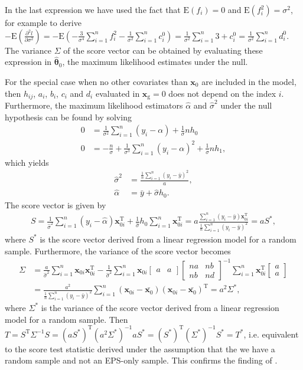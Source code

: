 \documentclass[10pt,a4paper]{article}
\def\bx{\mathbf{x}}
\def\bxoi{\mathbf{x}_{0i}}
\def\bxg{\mathbf{x}_{\text{g}}}
\def\E{\text{E}}
\begin{document}
In the last expression we have used the fact that $\E(f_i) = 0$ and $\E(f_i^{2}) = \sigma^{2}$, for example to derive $- \E\left(\frac{\partial^2 l}{\partial \sigma^2}\right) = -\E(- \frac{3}{\sigma^4}\sum_{i=1}^n f_i^2 - \frac{1}{\sigma^2}\sum_{i=1}^n c_i^{0} ) = \frac{1}{\sigma^2}\sum_{i=1}^n 3 + c_i^{0} = \frac{1}{\sigma^2}\sum_{i=1}^n d_i^{0}$. The variance $\Sigma$ of the score vector can  be obtained by evaluating these expression in $\hat{\boldsymbol\theta}_0$, the maximum likelihood estimates under the null.

For the special case when no other covariates than $\bx_0$ are included in the model, then $h_{ij}$, $a_i$, $b_i$, $c_i$ and $d_i$ evaluated in $\bxg = 0$ does not depend on the index $i$. Furthermore, the maximum likelihood estimators $\hat{\alpha}$ and $\hat{\sigma}^2$ under the null hypothesis can be found by solving
\begin{align*}
0 & = \frac{1}{\sigma^2}\sum_{i=1}^n (y_i - \alpha) + \frac{1}{\sigma}nh_0 \\
0 & = -\frac{n}{\sigma} + \frac{1}{\sigma^3}\sum_{i=1}^n(y_i - \alpha)^2 + \frac{1}{\sigma}nh_1,
\end{align*}
which yields 
\begin{align*}
\hat{\sigma}^2 &= \frac{\frac{1}{n}\sum_{i=1}^n (y_i - \bar{y})^2}{a}, \\
\hat{\alpha} &= \bar{y} + \hat{\sigma}h_0.
\end{align*}
The score vector is given by
\begin{align*}
S = \frac{1}{\hat{\sigma}^2}\sum_{i=1}^n (y_i - \hat{\alpha}) \bxoi^{\text{T}} + \frac{1}{\hat{\sigma}}h_0\sum_{i=1}^n  \bxoi^{\text{T}} = a \frac{\sum_{i=1}^n (y_i - \bar{y})\bxoi^{\text{T}}}{\frac{1}{n}\sum_{i=1}^n (y_i - \bar{y})^2} = aS^*,
\end{align*}
where $S^*$ is the score vector derived from a linear regression model for a random sample. Furthermore, the variance of the score vector becomes
\begin{align*}
\Sigma &= \frac{a}{\hat{\sigma}^2}\sum_{i=1}^n \bxoi \bxoi^{\text{T}} - \frac{1}{\hat{\sigma}^2} \sum_{i=1}^n \bxoi \begin{bmatrix}
a & a 
\end{bmatrix} \begin{bmatrix}
n a & n b \\ n b & n d 
\end{bmatrix}^{-1} \sum_{i=1}^n \bxoi^{\text{T}} \begin{bmatrix}
a \\ a 
\end{bmatrix} \\ &= \frac{a^2}{\frac{1}{n}\sum_{i=1}^n (y_i - \bar{y})^2} \sum_{i=1}^n (\bxoi-\bar{\bx_0})(\bxoi-\bar{\bx_0})^{\text{T}} = a^2 \Sigma^*,
\end{align*}
where $\Sigma^*$ is the variance of the score vector derived from a linear regression model for a random sample. Then $T = S^{\text{T}} \Sigma^{-1} S = (aS^*)^{\text{T}} (a^2\Sigma^*)^{-1} aS^* = (S^*)^{\text{T}} (\Sigma^*)^{-1} S^* = T^*$, i.e. equivalent to the score test statistic derived under the assumption that the we have a random sample and not an EPS-only sample. This confirms the finding of \cite{tang2010equivalence}.
\end{document}
